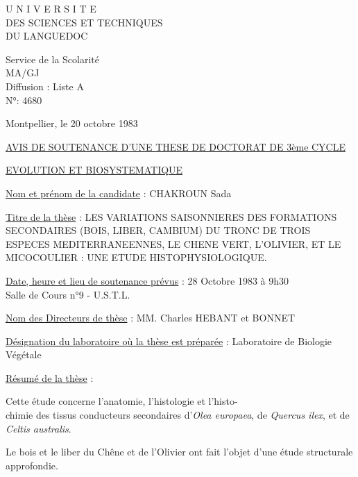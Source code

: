 

\noindent
\begin{minipage}[t]{0.44\linewidth}
\centering
U N I V E R S I T E\\
DES SCIENCES ET TECHNIQUES\\
DU LANGUEDOC\\
\texttt{\textunderscore\textunderscore\textunderscore\textunderscore\textunderscore\textunderscore\textunderscore\textunderscore\textunderscore\textunderscore\textunderscore\textunderscore}

Service de la Scolarité\\
MA/GJ\\
Diffusion : Liste A\\
N°: 4680
\end{minipage}\hfill
\begin{minipage}[t]{0.53\linewidth}
\raggedleft
\vspace{2\baselineskip}
Montpellier, le 20 octobre 1983
\end{minipage}

\begin{center}
\uline{AVIS DE SOUTENANCE D'UNE THESE DE DOCTORAT DE 3ème CYCLE}

\uline{EVOLUTION ET BIOSYSTEMATIQUE}
\end{center}

\uline{Nom et prénom de la candidate} : CHAKROUN Sada

\uline{Titre de la thèse} : LES VARIATIONS SAISONNIERES DES FORMATIONS SECONDAIRES (BOIS, LIBER, CAMBIUM) DU TRONC DE TROIS ESPECES MEDITERRANEENNES, LE CHENE VERT, L'OLIVIER, ET LE MICOCOULIER : UNE ETUDE HISTOPHYSIOLOGIQUE.

\uline{Date, heure et lieu de soutenance prévus} : 28 Octobre 1983 à 9h30\\
Salle de Cours n°9 - U.S.T.L.

\uline{Nom des Directeurs de thèse} : MM. Charles HEBANT et BONNET

\uline{Désignation du laboratoire où la thèse est préparée} : Laboratoire de Biologie Végétale

\uline{Résumé de la thèse} :

Cette étude concerne l'anatomie, l'histologie et l'histo-\\
chimie des tissus conducteurs secondaires d'\textit{Olea europaea}, de \textit{Quercus ilex}, et de \textit{Celtis australis}.

Le bois et le liber du Chêne et de l'Olivier ont fait l'objet d'une étude structurale approfondie.

